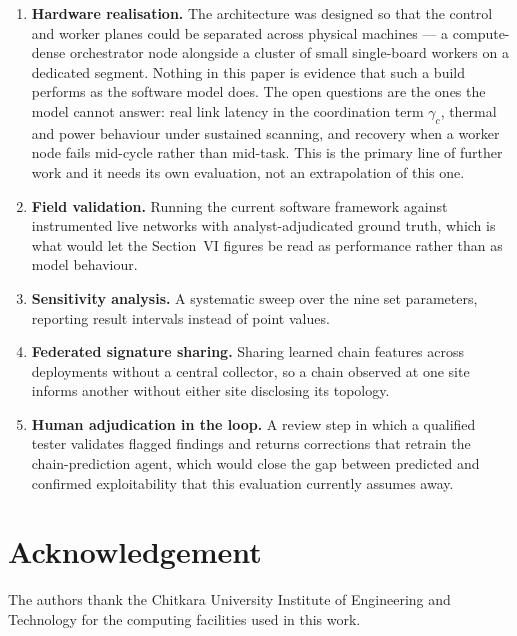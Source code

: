 \documentclass[journal]{IEEEtran}
\begin{document}
\begin{enumerate}
  \item \textbf{Hardware realisation.} The architecture was designed so that
        the control and worker planes could be separated across physical
        machines --- a compute-dense orchestrator node alongside a cluster of
        small single-board workers on a dedicated segment. Nothing in this
        paper is evidence that such a build performs as the software model
        does. The open questions are the ones the model cannot answer: real
        link latency in the coordination term $\gamma_c$, thermal and power
        behaviour under sustained scanning, and recovery when a worker node
        fails mid-cycle rather than mid-task. This is the primary line of
        further work and it needs its own evaluation, not an extrapolation of
        this one.
  \item \textbf{Field validation.} Running the current software framework
        against instrumented live networks with analyst-adjudicated ground
        truth, which is what would let the Section~VI figures be read as
        performance rather than as model behaviour.
  \item \textbf{Sensitivity analysis.} A systematic sweep over the nine set
        parameters, reporting result intervals instead of point values.
  \item \textbf{Federated signature sharing.} Sharing learned chain features
        across deployments without a central collector, so a chain observed at
        one site informs another without either site disclosing its topology.
  \item \textbf{Human adjudication in the loop.} A review step in which a
        qualified tester validates flagged findings and returns corrections
        that retrain the chain-prediction agent, which would close the gap
        between predicted and confirmed exploitability that this evaluation
        currently assumes away.
\end{enumerate}

\section*{Acknowledgement}

The authors thank the Chitkara University Institute of Engineering and
Technology for the computing facilities used in this work.
\end{document}
